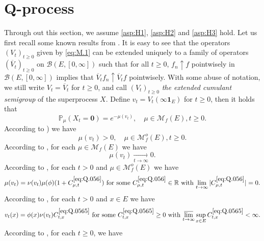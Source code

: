 \documentclass[12pt,a4paper]{amsart}
\numberwithin{equation}{section}
\theoremstyle{plain}
\theoremstyle{definition}
\theoremstyle{remark}
\begin{document}
\section{Q-process} \label{sec:Q}
	Through out this section, we assume \eqref{asp:H1}, \eqref{asp:H2} and \eqref{asp:H3} hold. 
	Let us first recall some known results from \cite{LiuRenSongSun2020}.
	It is easy to see that the operators $(V_t)_{t\geq 0}$
	given by \eqref{eq:M.1} can be extended uniquely to a family of operators $(\overline V_t)_{t\geq 0}$ on $\mathcal B(E,[0,\infty])$ such that for all $t\geq 0$, $f_n \uparrow f$ pointwisely in  $\mathcal B(E, [0,\infty])$ implies that $\overline V_tf_n \uparrow \overline V_tf$ pointwisely.
	With some abuse of notation, we still write $V_t = \overline V_t$ for $t\geq 0$, and call $(V_t)_{t\geq 0}$ \emph{the extended cumulant semigroup} of the superprocess $X$.
	Define $v_t = V_t(\infty  \mathbf 1_E)$ for $t\geq 0$, then it holds that
	\begin{equation} \label{eq:Q.04}
	\mathbb P_\mu (X_t = \mathbf 0)
	= e^{- \mu (v_t)},
	\quad \mu \in \mathcal M_f(E), t\geq 0.
	\end{equation}
	According to \cite[(1.10)]{LiuRenSongSun2020}) we have
\begin{equation}\label{eq:Q.05}
	\mu(v_t) > 0, \quad \mu \in \mathcal M_f^o(E), t \geq 0.
\end{equation}
	According to \cite[Proposition 1.3]{LiuRenSongSun2020}, for each $\mu\in \mathcal M_f(E)$ we have
\begin{equation} \label{eq:Q.055}
	\mu(v_t) \xrightarrow[t\to \infty]{} 0.
\end{equation} 
	According to \cite[(1.17)]{LiuRenSongSun2020}, for each $t>0$ and $\mu \in \mathcal M_f^o(E)$ we have 
\begin{equation} \label{eq:Q.056}
	\text{$\mu(v_t) = \nu(v_t)\mu(\phi) (1+C_{\mu,t}^{\eqref{eq:Q.056}})$ for some $C_{\mu,t}^{\eqref{eq:Q.056}}\in \mathbb R$ with $\lim_{t\to \infty}|C_{\mu,t}^{\eqref{eq:Q.056}}| = 0$.}
\end{equation}
	According to \cite[(2.14)]{LiuRenSongSun2020}, for each $t>0$ and $x\in E$ we have
\begin{equation}  \label{eq:Q.0565}
	\text{$v_t(x) = \phi(x) \nu(v_t) C_{t,x}^{\eqref{eq:Q.0565}}$ for some $C_{t,x}^{\eqref{eq:Q.0565}}\geq 0$ with $\varlimsup_{t\to \infty}\sup_{x\in E}C_{t,x}^{\eqref{eq:Q.0565}}<\infty$.}
\end{equation}
	According to \cite[(2.20)]{LiuRenSongSun2020}, for each $t\geq 0$, we have
\end{document}

